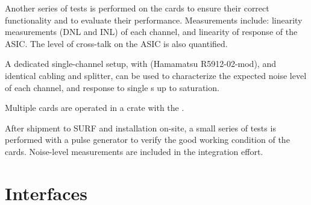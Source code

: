 Another series of tests is performed on %
the cards to ensure their correct functionality and to evaluate their performance. Measurements include: linearity measurements (DNL and INL) of each  channel, and %
linearity of response of the ASIC. The level of cross-talk on the ASIC %
is also quantified.

A dedicated single-channel setup, with  (Hamamatsu R5912-02-mod), and identical cabling and splitter, can be used to characterize the expected noise level of each channel, and response to single \phel{}s up to saturation. 

Multiple cards are operated in a  crate with the %
.

After %
shipment to SURF and installation on-site, a small series of tests is performed with a pulse generator to verify the good working condition of the cards. Noise-level measurements are %
included in the integration effort.




\section{Interfaces}
\label{sec:fddp-tpc-elec-intfc}


